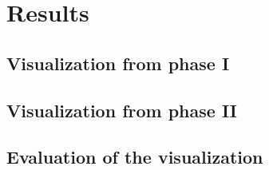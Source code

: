 \chapter{Results}

\section{Visualization from phase I}
\todo{[to be filled in]}


\section{Visualization from phase II}
\todo{[to be filled in]}


\section{Evaluation of the visualization}
\todo{[to be filled in]}
